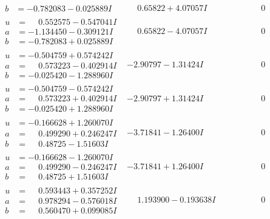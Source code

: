 \documentclass[1p]{elsarticle_modified}
\theoremstyle{definition}
\begin{document}
$$\begin{array}{c|c|c}
\begin{aligned}
b &= -0.782083 - 0.025889 I\end{aligned}
 & \phantom{-}0.65822 + 4.07057 I & \phantom{-0.000000 } 0 \\ \hline\begin{aligned}
u &= \phantom{-}0.552575 - 0.547041 I \\
a &= -1.134450 - 0.309121 I \\
b &= -0.782083 + 0.025889 I\end{aligned}
 & \phantom{-}0.65822 - 4.07057 I & \phantom{-0.000000 } 0 \\ \hline\begin{aligned}
u &= -0.504759 + 0.574242 I \\
a &= \phantom{-}0.573223 - 0.402914 I \\
b &= -0.025420 - 1.288960 I\end{aligned}
 & -2.90797 - 1.31424 I & \phantom{-0.000000 } 0 \\ \hline\begin{aligned}
u &= -0.504759 - 0.574242 I \\
a &= \phantom{-}0.573223 + 0.402914 I \\
b &= -0.025420 + 1.288960 I\end{aligned}
 & -2.90797 + 1.31424 I & \phantom{-0.000000 } 0 \\ \hline\begin{aligned}
u &= -0.166628 + 1.260070 I \\
a &= \phantom{-}0.499290 + 0.246247 I \\
b &= \phantom{-}0.48725 - 1.51603 I\end{aligned}
 & -3.71841 - 1.26400 I & \phantom{-0.000000 } 0 \\ \hline\begin{aligned}
u &= -0.166628 - 1.260070 I \\
a &= \phantom{-}0.499290 - 0.246247 I \\
b &= \phantom{-}0.48725 + 1.51603 I\end{aligned}
 & -3.71841 + 1.26400 I & \phantom{-0.000000 } 0 \\ \hline\begin{aligned}
u &= \phantom{-}0.593443 + 0.357252 I \\
a &= \phantom{-}0.978294 - 0.576018 I \\
b &= \phantom{-}0.560470 + 0.099085 I\end{aligned}
 & \phantom{-}1.193900 - 0.193638 I & \phantom{-0.000000 } 0 \\ \hline\begin{aligned}

\end{aligned}
\end{array}$$
\end{document}
